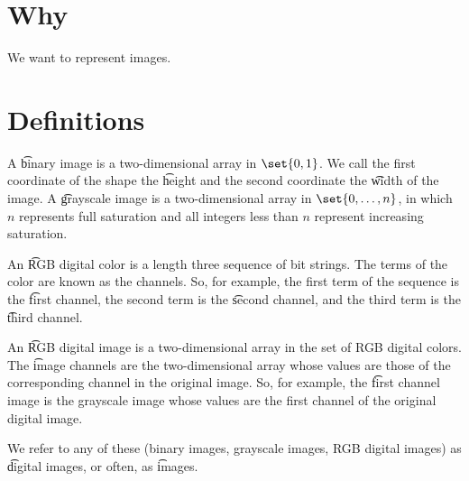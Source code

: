 

\section*{Why}

We want to represent images.

\section*{Definitions}

A \t{binary image} is a two-dimensional array in $\set{0, 1}$.
We call the first coordinate of the shape the \t{height} and the second coordinate the \t{width} of the image.
A \t{grayscale image} is a two-dimensional array in $\set{0, \dots , n}$, in which $n$ represents full saturation and all integers less than $n$ represent increasing saturation.

An \t{RGB digital color} is a length three sequence of bit strings.
The terms of the color are known as the channels.
So, for example, the first term of the sequence is the \t{first channel}, the second term is the \t{second channel}, and the third term is the \t{third channel}.

An \t{RGB digital image} is a two-dimensional array in the set of RGB digital colors.
The \t{image channels} are the two-dimensional array whose values are those of the corresponding channel in the original image.
So, for example, the \t{first channel image} is the grayscale image whose values are the first channel of the original digital image.

We refer to any of these (binary images, grayscale images, RGB digital images) as \t{digital images}, or often, as \t{images}.

\blankpage